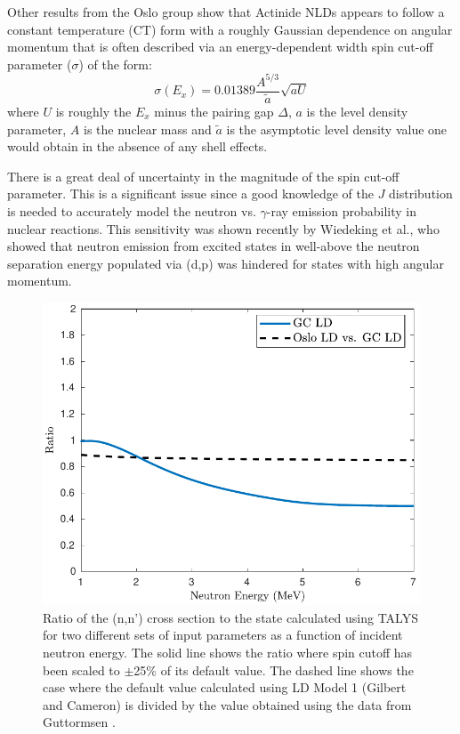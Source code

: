 \documentclass[letterpaper]{ar-1col}
\newcommand{\pp}[1]{\left( #1\right)}
\begin{document}
Other results from the Oslo group show that Actinide NLDs appears to follow a constant temperature (CT) form with a roughly Gaussian dependence on angular momentum that is often described via an energy-dependent width spin cut-off parameter ($\sigma$) of the form: 
\begin{equation}\label{eqn:spin_cutoff}
\sigma\pp{E_x}=0.01389 \dfrac{A^{5/3}}{\widetilde{a}}\sqrt{aU}
\end{equation}
where $U$ is roughly the $E_x$ minus the pairing gap $\Delta$, $a$ is the level density parameter, $A$ is the nuclear mass and $\widetilde{a}$ is the asymptotic level density value one would obtain in the absence of any shell effects. 

There is a great deal of uncertainty in the magnitude of the spin cut-off parameter.  This is a significant issue since a good knowledge of the $J$ distribution is needed to accurately model the neutron vs. $\gamma$-ray emission probability in nuclear reactions.  This sensitivity was shown recently by Wiedeking et al., \cite{Wie16} who showed that neutron emission from excited states in  well-above the neutron separation energy populated via (d,p) was hindered for states with high angular momentum. 



\begin{figure}
 \centering
 \includegraphics[width=0.7\linewidth]{fig3.pdf}

 \caption{Ratio of the (n,n') cross section to the state calculated using TALYS for two different sets of input parameters as a function of incident neutron energy. The solid line shows the ratio where spin cutoff has been scaled to $\pm$25\% of its default value. The dashed line shows the case where the default value calculated using LD Model 1 (Gilbert and Cameron) is divided by the value obtained using the data from Guttormsen \cite{Gut13a}.}
 \label{fig:oslo_ld_plot}
\end{figure}
\end{document}
